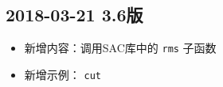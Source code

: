 \subsection*{2018-03-21 3.6版}
\begin{itemize}
\item 新增内容：调用SAC库中的 \texttt{rms} 子函数
\item 新增示例： \texttt{cut}
\end{itemize}
